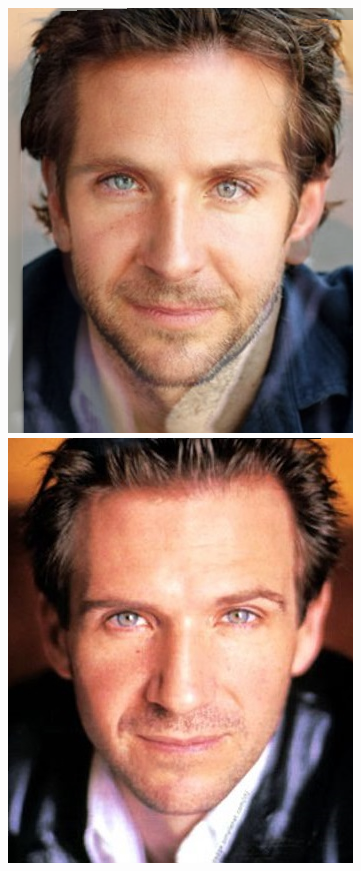 \documentclass[conference]{IEEEtran}
\begin{document}
\begin{figure}[H]
\begin{multicols}{3}
    \includegraphics[width=1.0\linewidth]{results/faces/G/img20.png} \par
    \includegraphics[width=1.0\linewidth]{results/faces/G/img50.png} \par

\end{multicols}
\end{figure}
\end{document}
